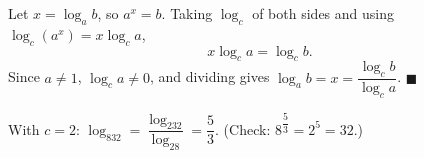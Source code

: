 Let $x=\log_ab$, so $a^x=b$. Taking $\log_c$ of both sides and using $\log_c(a^x)=x\log_ca$,
\[x\log_ca=\log_cb.\]
Since $a\ne1$, $\log_ca\ne0$, and dividing gives $\log_ab=x=\dfrac{\log_cb}{\log_ca}$. $\blacksquare$

With $c=2$: $\log_832=\dfrac{\log_232}{\log_28}=\boxed{\dfrac53}$. (Check: $8^{\dfrac53}=2^5=32$.)
